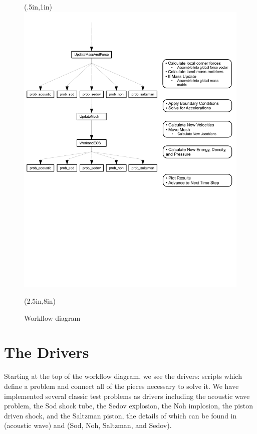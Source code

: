 \begin{figure}[p]
\begin{textblock*}{7.5in}(.5in,1in)
\centering
   \includegraphics[trim = 0in 4in 0in 0in,clip,width=7.5in]{./Figures/CodeOutline2.pdf}
\end{textblock*}
\begin{textblock*}{3.5in}(2.5in,8in)
\caption{Workflow diagram}
 \label{fig:workflow}
\end{textblock*}
\end{figure}
\mbox{}\clearpage
\newpage

\section{The Drivers} \label{sec:strongmassupdate}
Starting at the top of the workflow diagram, we see the drivers: scripts which define a problem and connect all of the pieces necessary to solve it. We have implemented several classic test problems as drivers including the acoustic wave problem, the Sod shock tube, the Sedov explosion, the Noh implosion, the piston driven shock, and the Saltzman piston, the details of which can be found in  (acoustic wave) and  (Sod, Noh, Saltzman, and Sedov).

